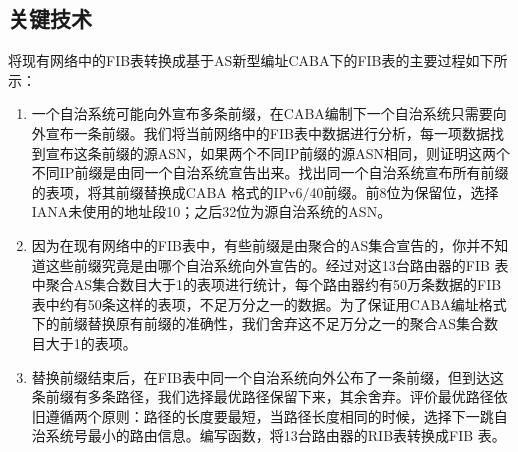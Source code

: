 \subsection{关键技术}
将现有网络中的FIB表转换成基于AS新型编址CABA下的FIB表的主要过程如下所示：
\begin{enumerate}
\item 一个自治系统可能向外宣布多条前缀，在CABA编制下一个自治系统只需要向外宣布一条前缀。我们将当前网络中的FIB表中数据进行分析，每一项数据找到宣布这条前缀的源ASN，如果两个不同IP前缀的源ASN相同，则证明这两个不同IP前缀是由同一个自治系统宣告出来。找出同一个自治系统宣布所有前缀的表项，将其前缀替换成CABA 格式的IPv6$/$40前缀。前8位为保留位，选择IANA未使用的地址段10；之后32位为源自治系统的ASN。
\item 因为在现有网络中的FIB表中，有些前缀是由聚合的AS集合宣告的，你并不知道这些前缀究竟是由哪个自治系统向外宣告的。经过对这13台路由器的FIB 表中聚合AS集合数目大于1的表项进行统计，每个路由器约有50万条数据的FIB表中约有50条这样的表项，不足万分之一的数据。为了保证用CABA编址格式下的前缀替换原有前缀的准确性，我们舍弃这不足万分之一的聚合AS集合数目大于1的表项。
\item 替换前缀结束后，在FIB表中同一个自治系统向外公布了一条前缀，但到达这条前缀有多条路径，我们选择最优路径保留下来，其余舍弃。评价最优路径依旧遵循两个原则：路径的长度要最短，当路径长度相同的时候，选择下一跳自治系统号最小的路由信息。编写函数，将13台路由器的RIB表转换成FIB 表。
\end{enumerate}

